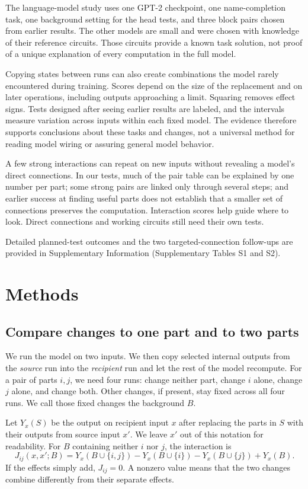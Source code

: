 \documentclass[11pt,letterpaper]{article}
\begin{document}
The language-model study uses one GPT-2 checkpoint, one name-completion task,
one background setting for the head tests, and three block pairs chosen from
earlier results. The other models are small and were chosen with knowledge of
their reference circuits. Those circuits provide a known task solution, not
proof of a unique explanation of every computation in the full model.

Copying states between runs can also create combinations the model rarely
encountered during training. Scores depend on the size of the replacement and
on later operations, including outputs approaching a limit. Squaring removes
effect signs. Tests designed after seeing earlier results are labeled, and
the intervals measure variation across inputs within each fixed model. The
evidence therefore supports conclusions about these tasks and changes, not
a universal method for reading model wiring or assuring general model behavior.



A few strong interactions can repeat on new inputs without revealing a model's
direct connections. In our tests, much of the pair table can be explained by
one number per part; some strong pairs are linked only through several steps;
and earlier success at finding useful parts does not establish that a smaller
set of connections preserves the computation. Interaction scores help guide
where to look. Direct connections and working circuits still need their own tests.

Detailed planned-test outcomes and the two targeted-connection follow-ups are provided in Supplementary Information (Supplementary Tables S1 and S2).

\section*{Methods}
\subsection*{Compare changes to one part and to two parts}
We run the model on two inputs. We then copy selected internal outputs from
the \emph{source} run into the \emph{recipient} run and let the rest of the model
recompute. For a pair of parts $i,j$, we need four runs: change neither part,
change $i$ alone, change $j$ alone, and change both. Other changes, if present,
stay fixed across all four runs. We call those fixed changes the background $B$.

Let $Y_x(S)$ be the output on recipient input $x$ after replacing the parts in
$S$ with their outputs from source input $x'$. We leave $x'$ out of this
notation for readability. For $B$ containing neither $i$ nor $j$, the
interaction is
\begin{equation}
 J_{ij}(x,x';B)=Y_x(B\cup\{i,j\})-Y_x(B\cup\{i\})
             -Y_x(B\cup\{j\})+Y_x(B).
 \label{eq:interaction}
\end{equation}
If the effects simply add, $J_{ij}=0$. A nonzero value means that the two
changes combine differently from their separate effects.
\end{document}

